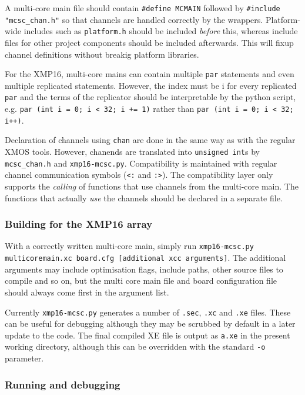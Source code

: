 \documentclass[12pt,a4paper,final,twoside]{article}
\begin{document}
A multi-core main file should contain \texttt{\#define MCMAIN} followed by \texttt{\#include "mcsc\_chan.h"} so that channels are handled correctly by the wrappers. Platform-wide includes such as \texttt{platform.h} should be included \textit{before} this, whereas include files for other project components should be included afterwards. This will fixup channel definitions without breakig platform libraries.

For the XMP16, multi-core mains can contain multiple \texttt{par} statements and even multiple replicated statements. However, the index must be i for every replicated \texttt{par} and the terms of the replicator should be interpretable by the python script, e.g. \texttt{par (int i = 0; i < 32; i += 1)} rather than \texttt{par (int i = 0; i < 32; i++)}.

Declaration of channels using \texttt{chan} are done in the same way as with the regular XMOS tools. However, chanends are translated into \texttt{unsigned int}s by \texttt{mcsc\_chan.h} and \texttt{xmp16-mcsc.py}. Compatibility is maintained with regular channel communication symbols (\texttt{<:} and \texttt{:>}). The compatibility layer only supports the \textit{calling} of functions that use channels from the multi-core main. The functions that actually \textit{use} the channels should be declared in a separate file.

\subsubsection{Building for the XMP16 array}

With a correctly written multi-core main, simply run  \texttt{xmp16-mcsc.py multicoremain.xc board.cfg [additional xcc arguments]}. The additional arguments may include optimisation flags, include paths, other source files to compile and so on, but the multi core main file and board configuration file should always come first in the argument list.

Currently \texttt{xmp16-mcsc.py} generates a number of \texttt{.sec}, \texttt{.xc} and \texttt{.xe} files. These can be useful for debugging although they may be scrubbed by default in a later update to the code. The final compiled XE file is output as \texttt{a.xe} in the present working directory, although this can be overridden with the standard \texttt{-o} parameter.

\subsubsection{Running and debugging}
\end{document}
